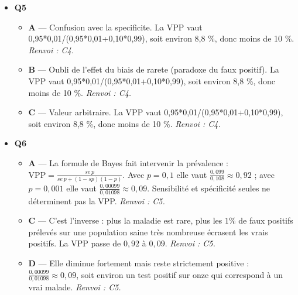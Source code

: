 \begin{itemize}
\begin{itemize}
    \item \textbf{C} — Terme de test d'hypothèse. La probabilité attribuée à A avant l'observation de B est la probabilité a priori. \emph{Renvoi : C3.}
    \item \textbf{D} — P(B|A) est la vraisemblance. La probabilité attribuée à A avant l'observation de B est la probabilité a priori. \emph{Renvoi : C3.}
  \end{itemize}
  \item \textbf{Q5}
  \begin{itemize}
    \item \textbf{A} — Confusion avec la specificite. La VPP vaut 0,95*0,01/(0,95*0,01+0,10*0,99), soit environ 8,8 \%, donc moins de 10 \%. \emph{Renvoi : C4.}
    \item \textbf{B} — Oubli de l'effet du biais de rarete (paradoxe du faux positif). La VPP vaut 0,95*0,01/(0,95*0,01+0,10*0,99), soit environ 8,8 \%, donc moins de 10 \%. \emph{Renvoi : C4.}
    \item \textbf{C} — Valeur arbitraire. La VPP vaut 0,95*0,01/(0,95*0,01+0,10*0,99), soit environ 8,8 \%, donc moins de 10 \%. \emph{Renvoi : C4.}
  \end{itemize}
  \item \textbf{Q6}
  \begin{itemize}
    \item \textbf{A} — La formule de Bayes fait intervenir la prévalence : $\mathrm{VPP}=\frac{se\,p}{se\,p+(1-sp)(1-p)}$. Avec $p=0{,}1$ elle vaut $\frac{0{,}099}{0{,}108}\approx0{,}92$ ; avec $p=0{,}001$ elle vaut $\frac{0{,}00099}{0{,}01098}\approx0{,}09$. Sensibilité et spécificité seules ne déterminent pas la VPP. \emph{Renvoi : C5.}
    \item \textbf{C} — C'est l'inverse : plus la maladie est rare, plus les $1\%$ de faux positifs prélevés sur une population saine très nombreuse écrasent les vrais positifs. La VPP passe de $0{,}92$ à $0{,}09$. \emph{Renvoi : C5.}
    \item \textbf{D} — Elle diminue fortement mais reste strictement positive : $\frac{0{,}00099}{0{,}01098}\approx0{,}09$, soit environ un test positif sur onze qui correspond à un vrai malade. \emph{Renvoi : C5.}
  \end{itemize}
\end{itemize}
\fi
